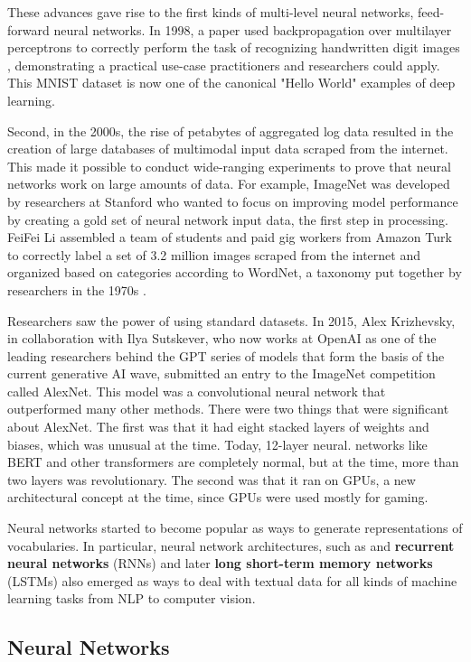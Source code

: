 \documentclass[11pt, table]{diazessay} %
\begin{document}
\begin{sloppypar}
These advances gave rise to the first kinds of multi-level neural networks, feed-forward neural networks. In 1998, a paper used backpropagation over multilayer perceptrons to correctly perform the task of recognizing handwritten digit images \citep{lecun1998gradient}, demonstrating a practical use-case practitioners and researchers could apply. This MNIST dataset is now one of the canonical "Hello World" examples of deep learning.

Second, in the 2000s, the rise of petabytes of aggregated log data resulted in the creation of large databases of multimodal input data scraped from the internet. This made it possible to conduct wide-ranging experiments to prove that neural networks work on large amounts of data. For example, ImageNet was developed by researchers at Stanford who wanted to focus on improving model performance by creating a gold set of neural network input data, the first step in processing. FeiFei Li assembled a team of students and paid gig workers from Amazon Turk to correctly label a set of 3.2 million images scraped from the internet and organized based on categories according to WordNet, a taxonomy put together by researchers in the 1970s \citep{russakovsky2015imagenet}.

Researchers saw the power of using standard datasets. In 2015, Alex Krizhevsky, in collaboration with Ilya Sutskever, who now works at OpenAI as one of the leading researchers behind the GPT series of models that form the basis of the current generative AI wave, submitted an entry to the ImageNet competition called AlexNet. This model was a convolutional neural network that outperformed many other methods. There were two things that were significant about AlexNet. The first was that it had eight stacked layers of weights and biases, which was unusual at the time. Today, 12-layer neural. networks like BERT and other transformers are completely normal, but at the time, more than two layers was revolutionary. The second was that it ran on GPUs, a new architectural concept at the time, since GPUs were used mostly for gaming.

Neural networks started to become popular as ways to generate representations of vocabularies. In particular, neural network architectures, such as  and \textbf{recurrent neural networks} (RNNs) and later \textbf{long short-term memory networks} (LSTMs) also emerged as ways to deal with textual data for all kinds of machine learning tasks from NLP to computer vision.


\subsection{Neural Networks}


\end{sloppypar}
\end{document}
